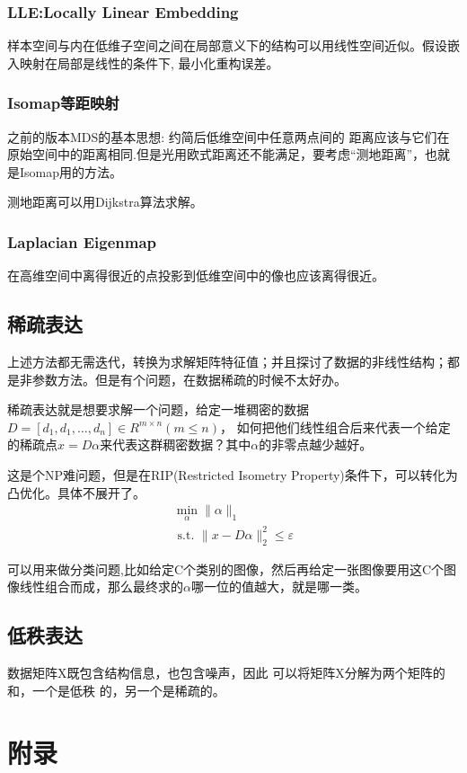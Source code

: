 \documentclass[12pt]{article}
\begin{document}
\subsubsection{LLE:Locally Linear Embedding}
样本空间与内在低维子空间之间在局部意义下的结构可以用线性空间近似。假设嵌入映射在局部是线性的条件下, 最小化重构误差。
\subsubsection{Isomap等距映射}
之前的版本MDS的基本思想: 约简后低维空间中任意两点间的 距离应该与它们在原始空间中的距离相同.但是光用欧式距离还不能满足，要考虑“测地距离”，也就是Isomap用的方法。

测地距离可以用Dijkstra算法求解。

\subsubsection{Laplacian Eigenmap}
在高维空间中离得很近的点投影到低维空间中的像也应该离得很近。

\subsection{稀疏表达}
上述方法都无需迭代，转换为求解矩阵特征值；并且探讨了数据的非线性结构；都是非参数方法。但是有个问题，在数据稀疏的时候不太好办。

稀疏表达就是想要求解一个问题，给定一堆稠密的数据$D=\left[d_{1}, d_{1}, \ldots, d_{n}\right] \in R^{m \times n}(m \leq n)$，
如何把他们线性组合后来代表一个给定的稀疏点$x=D\alpha$来代表这群稠密数据？其中$\alpha$的非零点越少越好。

这是个NP难问题，但是在RIP(Restricted Isometry Property)条件下，可以转化为凸优化。具体不展开了。
\begin{equation}
    \nonumber
    \begin{array}{l}
        \min _{\alpha}\|\alpha\|_{1} \\
        \text { s.t. }\|x-D \alpha\|_{2}^{2} \leq \varepsilon
        \end{array}
\end{equation}

可以用来做分类问题,比如给定C个类别的图像，然后再给定一张图像要用这C个图像线性组合而成，那么最终求的$\alpha$哪一位的值越大，就是哪一类。


\subsection{低秩表达}
数据矩阵X既包含结构信息，也包含噪声，因此
可以将矩阵X分解为两个矩阵的和，一个是低秩 的，另一个是稀疏的。

\newpage
\section{附录}
\end{document}
